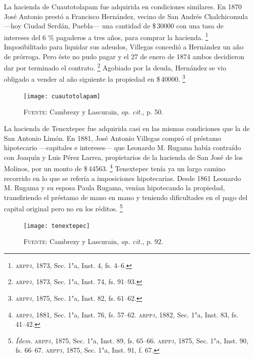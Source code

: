 \documentclass[14pt,twoside,final]{extbook} %
\let\oldfootnote\footnote
\renewcommand\footnote[1]{%
\oldfootnote{\hspace{1mm}#1}}
\begin{document}
La hacienda de Cuautotolapam fue adquirida en condiciones similares. En 1870 José Antonio prestó a Francisco Hernández, vecino de San Andrés Chalchicomula ---hoy Ciudad Serdán, Puebla--- una cantidad de \$\,30000 con una tasa de intereses del 6 \% pagaderos a tres años, para comprar la hacienda.\footnote{\textsc{arppj}, 1873, Sec. 1"a, Inst. 4, fs. 4--6.} Imposibilitado para liquidar sus adeudos, Villegas concedió a Hernández un año de prórroga. Pero éste no pudo pagar y el 27 de enero de 1874 ambos decidieron dar por terminado el contrato.\footnote{\textsc{arppj}, 1873, Sec. 1"a, Inst. 74, fs. 91--93.} Agobiado por la deuda, Hernández se vio obligado a vender al año siguiente la propiedad en \$\,40000.\footnote{\textsc{arppj}, 1875, Sec. 1"a, Inst. 82, fs. 61--62.}
\begin{figure}
\centering
\texttt{[image: cuautotolapam]}
\caption[Plano de la hacienda de Cuautotolapam]{\textsc{Fuente:} Cambrezy y Lascurain, \emph{op. cit.,} p. 50.}
\label{fig:hda-cuatotolapam}
\end{figure}

La hacienda de Tenextepec fue adquirida casi en las mismas condiciones que la de San Antonio Limón. En 1881, José Antonio Villegas compró el préstamo hipotecario ---capitales e intereses--- que Leonardo M. Rugama había contraído con Joaquín y Luis Pérez Larrea, propietarios de la hacienda de San José de los Molinos, por un monto de \$\,44563.\footnote{\textsc{arppj}, 1881, Sec. 1"a, Inst. 76, fs. 57--62. \textsc{arppj}, 1882, Sec. 1"a, Inst. 83, fs. 41--42.} Tenextepec tenía ya un largo camino recorrido en lo que se refería a imposiciones hipotecarias. Desde 1861 Leonardo M. Rugama y su esposa Paula Rugama, venían hipotecando la propiedad, transfiriendo el préstamo de mano en mano y teniendo dificultades en el pago del capital original pero no en los réditos.\footnote{\emph{Ídem}. \textsc{arppj}, 1875, Sec. 1"a, Inst. 89, fs. 65--66. \textsc{arppj}, 1875, Sec. 1"a, Inst. 90, fs. 66--67. \textsc{arppj}, 1875, Sec. 1"a, Inst. 91, f. 67.}
\begin{figure}
\centering
\texttt{[image: tenextepec]}
\caption[Plano de la hacienda de Tenextepec]{\textsc{Fuente:} Cambrezy y Lascurain, \emph{op. cit.,} p. 92.}
\label{fig:hda-tenextepec}
\end{figure}
\end{document}
